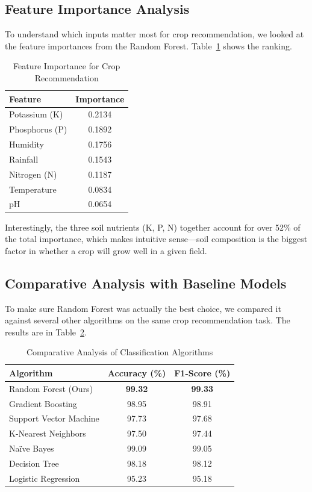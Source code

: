 \documentclass[conference]{IEEEtran}
\begin{document}
\subsection{Feature Importance Analysis}
To understand which inputs matter most for crop recommendation, we looked at the feature importances from the Random Forest. Table~\ref{tab:feature_importance} shows the ranking.

\begin{table}[htbp]
\caption{Feature Importance for Crop Recommendation}
\label{tab:feature_importance}
\centering
\begin{tabular}{@{}lc@{}}
\toprule
\textbf{Feature} & \textbf{Importance} \\
\midrule
Potassium (K) & 0.2134 \\
Phosphorus (P) & 0.1892 \\
Humidity & 0.1756 \\
Rainfall & 0.1543 \\
Nitrogen (N) & 0.1187 \\
Temperature & 0.0834 \\
pH & 0.0654 \\
\bottomrule
\end{tabular}
\end{table}

Interestingly, the three soil nutrients (K, P, N) together account for over 52\% of the total importance, which makes intuitive sense---soil composition is the biggest factor in whether a crop will grow well in a given field.

\subsection{Comparative Analysis with Baseline Models}
To make sure Random Forest was actually the best choice, we compared it against several other algorithms on the same crop recommendation task. The results are in Table~\ref{tab:comparison}.

\begin{table}[htbp]
\caption{Comparative Analysis of Classification Algorithms}
\label{tab:comparison}
\centering
\begin{tabular}{@{}lcc@{}}
\toprule
\textbf{Algorithm} & \textbf{Accuracy (\%)} & \textbf{F1-Score (\%)} \\
\midrule
Random Forest (Ours) & \textbf{99.32} & \textbf{99.33} \\
Gradient Boosting & 98.95 & 98.91 \\
Support Vector Machine & 97.73 & 97.68 \\
K-Nearest Neighbors & 97.50 & 97.44 \\
Na\"ive Bayes & 99.09 & 99.05 \\
Decision Tree & 98.18 & 98.12 \\
Logistic Regression & 95.23 & 95.18 \\
\bottomrule
\end{tabular}
\end{table}
\end{document}
